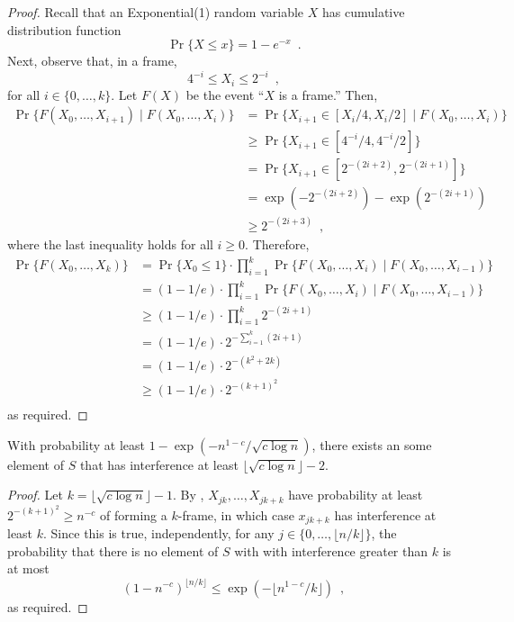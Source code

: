 \documentclass{patmorin}
\begin{document}
\begin{proof}
Recall that an Exponential(1) random variable $X$ has cumulative
distribution function
\[
   \Pr\{X \le x\} = 1-e^{-x} \enspace .
\]
Next, observe that, in a frame,
\[
                 4^{-i} \le X_i \le 2^{-i}  \enspace ,
\]
for all $i\in\{0,\ldots,k\}$.  Let $F(X)$ be the event ``$X$ is a frame.''
Then,
\begin{align*}
     \Pr\{F(X_0,\ldots,X_{i+1}) \mid F(X_0,\ldots,X_{i})\} 
        & = \Pr\{X_{i+1} \in [X_{i}/4,X_{i}/2] \mid F(X_0,\ldots,X_{i})\} \\
        & \ge \Pr\{X_{i+1} \in [4^{-i}/4,4^{-i}/2]\} \\
        & = \Pr\{X_{i+1} \in [2^{-(2i+2)},2^{-(2i+1)}]\} \\
        & = \exp(-2^{-(2i+2)}) - \exp(2^{-(2i+1)}) \\
        & \ge 2^{-(2i+3)} \enspace ,
\end{align*}
where the last inequality holds for all $i\ge 0$.  Therefore,
\begin{align*}
     \Pr\{F(X_0,\ldots,X_{k})\}
   & = \Pr\{X_0\le 1\}
         \cdot\prod_{i=1}^k \Pr\{F(X_0,\ldots,X_{i})
                                 \mid F(X_0,\ldots,X_{i-1})\} \\
   & = (1-1/e)
         \cdot\prod_{i=1}^k \Pr\{F(X_0,\ldots,X_{i})
                                 \mid F(X_0,\ldots,X_{i-1})\} \\
   & \ge (1-1/e)\cdot\prod_{i=1}^k 2^{-(2i+1)} \\
   & = (1-1/e)\cdot2^{-\sum_{i=1}^k(2i+1)} \\
   & = (1-1/e)\cdot2^{-(k^2+2k)} \\
   & \ge (1-1/e)\cdot2^{-(k+1)^2} \\
\end{align*}
as required.
\end{proof}


\begin{lem}
With probability at least $1-\exp(-n^{1-c}/\sqrt{c\log n})$, there exists
an some element of $S$ that has interference at least $\lfloor\sqrt{c\log
n}\rfloor-2$.
\end{lem}

\begin{proof}
Let $k=\lfloor \sqrt{c\log n} \rfloor-1$.  By ,
$X_{jk},\ldots,X_{jk+k}$ have probability at least $2^{-(k+1)^2}\ge
n^{-c}$ of forming a $k$-frame, in which case $x_{jk+k}$ has
interference at least $k$.  Since this is true, independently, for any
$j\in\{0,\ldots,\lfloor n/k\rfloor\}$, the probability that there is no
element of $S$ with with interference greater than $k$ is at most
\[
   (1-n^{-c})^{\lfloor n/k\rfloor} \le \exp(-\lfloor n^{1-c}/k\rfloor) \enspace ,
\]
as required.
\end{proof}
\end{document}
